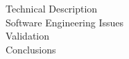 \documentclass[a4paper,11pt,titlepage]{article}
\begin{document}
\begin{description}
	\item[Technical Description]


	\item[Software Engineering Issues]

	\item[Validation]

	\item[Conclusions]

\end{description}
\end{document}
